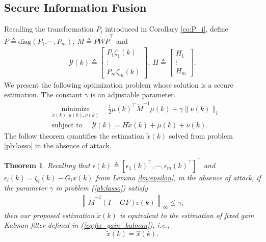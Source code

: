 \documentclass{ieeetrans}   %
\newcommand{\Yc}{{\mathcal{Y}}}
\newtheorem{theorem}{\textbf{Theorem}}
\begin{document}
\subsection{Secure Information Fusion}
Recalling the transformation $P_i$ introduced in Corollary \ref{co:P_i}, define $\tilde{P} \triangleq \text{diag}\left(P_1,\cdots,P_m\right),\ \tilde{M}\triangleq\tilde{P}\tilde{W}\tilde{P}^\top$ and
\begin{align}
	\Yc (k)\triangleq
	\begin{bmatrix}
		P_1\zeta_{1}(k) \\
		\vdots \\
		P_m\zeta_{m}(k)
	\end{bmatrix}, \
	H\triangleq\begin{bmatrix}
		H_{1} \\
		\vdots \\
		H_{m}
	\end{bmatrix} .	
\end{align}
We present the following optimization problem whose solution is a secure estimation. The constant $\gamma$ is an adjustable parameter.
\begin{subequations}\label{pb:lasso}
	\begin{align}
		&\underset{\tilde{x}(k), \mu(k),\nu(k)}{\operatorname{minimize}}\quad \frac{1}{2} \mu(k)^\top \tilde{M}^{-1} \mu(k) + \gamma\|\nu(k)\|_1 \label{min:old_ls} \\
		&\ \text{subject to }\quad
		\Yc(k)=H \tilde{x}(k) +\mu(k)+\nu(k). \label{eq:old_ls}
	\end{align}
\end{subequations}
The follow theorem quantifies the estimation $\tilde{x}(k)$ solved from problem \eqref{pb:lasso} in the absence of attack. 
\begin{theorem}\label{th:no_attack}
	Recalling that $\epsilon(k)\triangleq\left[\epsilon_1(k)^\top,\cdots,\epsilon_m(k)^\top\right]^\top$ and $\epsilon_i(k)=\zeta_i(k)-G_ix(k)$ from Lemma \ref{lm:epsilon}, in the absence of attack, if the parameter $\gamma$ in problem (\ref{pb:lasso}) satisfy
	\begin{align}\label{eq:kalman_cond}
		\left\|\tilde{M}^{-1}\left(I-GF\right)\epsilon(k)\right\|_\infty \leq \gamma,
	\end{align}
	then our proposed estimation $\tilde{x}(k)$ is equivalent to the estimation of fixed gain Kalman filter defined in (\ref{eq:fix_gain_kalman}), i.e.,
	\begin{equation}\label{eq:eq_to_kalman}
		\tilde{x}(k)=\hat{x}(k).
	\end{equation}
\end{theorem}
\end{document}
